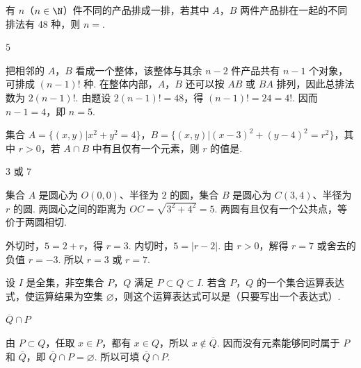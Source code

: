 \begin{problem}
有 \(n\)（\(n \in \N\)）件不同的产品排成一排，若其中 \(A\)，\(B\) 两件产品排在一起的不同排法有 48 种，则 \(n = \)\fillinblank{}.
\end{problem}

\begin{answer}
\(5\)
\end{answer}

\begin{solution}
把相邻的 \(A\)，\(B\) 看成一个整体，该整体与其余 \(n-2\) 件产品共有 \(n-1\) 个对象，可排成 \((n-1)!\) 种. 在整体内部，\(A\)，\(B\) 还可以按 \(AB\) 或 \(BA\) 排列，因此总排法数为 \(2(n-1)!\). 由题设
\(2(n-1)!=48\)，得 \((n-1)!=24=4!\). 因而 \(n-1=4\)，即 \(n=5\).
\end{solution}

\begin{problem}
集合 \(A = \{(x, y) | x^2 + y^2 = 4\}\)，\(B = \{(x, y) | (x - 3)^2 + (y - 4)^2 = r^2\}\)，其中 \(r > 0\)，若 \(A \cap B\) 中有且仅有一个元素，则 \(r\) 的值是\fillinblank{}.
\end{problem}

\begin{answer}
\(3\) 或 \(7\)
\end{answer}

\begin{solution}
集合 \(A\) 是圆心为 \(O(0,0)\)、半径为 \(2\) 的圆，集合 \(B\) 是圆心为 \(C(3,4)\)、半径为 \(r\) 的圆. 两圆心之间的距离为 \(OC=\sqrt{3^2+4^2}=5\). 两圆有且仅有一个公共点，等价于两圆相切.

外切时，\(5=2+r\)，得 \(r=3\). 内切时，\(5=|r-2|\). 由 \(r>0\)，解得 \(r=7\) 或舍去的负值 \(r=-3\). 所以 \(r=3\) 或 \(r=7\).
\end{solution}

\begin{problem}
设 \(I\) 是全集，非空集合 \(P\)，\(Q\) 满足 \(P \subset Q \subset I\). 若含 \(P\)，\(Q\) 的一个集合运算表达式，使运算结果为空集 \(\varnothing\)，则这个运算表达式可以是（只要写出一个表达式）\fillinblank{}.
\end{problem}

\begin{answer}
\(\overline{Q}\cap P\)
\end{answer}

\begin{solution}
由 \(P\subset Q\)，任取 \(x\in P\)，都有 \(x\in Q\)，所以 \(x\notin\overline Q\). 因而没有元素能够同时属于 \(P\) 和 \(\overline Q\)，即
\(\overline Q\cap P=\varnothing\). 所以可填 \(\overline Q\cap P\).
\end{solution}

